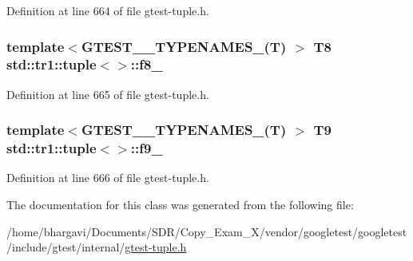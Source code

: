 Definition at line 664 of file gtest-\/tuple.\+h.

\subsubsection[{\texorpdfstring{f8\+\_\+}{f8_}}]{\setlength{\rightskip}{0pt plus 5cm}template$<$G\+T\+E\+S\+T\+\_\+\_\+\+T\+Y\+P\+E\+N\+A\+M\+E\+S\+\_\+(\+T) $>$ T8 {\bf std\+::tr1\+::tuple}$<$$>$\+::f8\+\_\+}\hypertarget{classstd_1_1tr1_1_1tuple_ae859012c83943e54e035a4a32089ccb6}{}\label{classstd_1_1tr1_1_1tuple_ae859012c83943e54e035a4a32089ccb6}


Definition at line 665 of file gtest-\/tuple.\+h.

\subsubsection[{\texorpdfstring{f9\+\_\+}{f9_}}]{\setlength{\rightskip}{0pt plus 5cm}template$<$G\+T\+E\+S\+T\+\_\+\_\+\+T\+Y\+P\+E\+N\+A\+M\+E\+S\+\_\+(\+T) $>$ T9 {\bf std\+::tr1\+::tuple}$<$$>$\+::f9\+\_\+}\hypertarget{classstd_1_1tr1_1_1tuple_a336d5e582fd34e45ec88c78d473671dd}{}\label{classstd_1_1tr1_1_1tuple_a336d5e582fd34e45ec88c78d473671dd}


Definition at line 666 of file gtest-\/tuple.\+h.



The documentation for this class was generated from the following file\+:\begin{DoxyCompactItemize}
\item 
/home/bhargavi/\+Documents/\+S\+D\+R/\+Copy\+\_\+\+Exam\+\_\+X/vendor/googletest/googletest/include/gtest/internal/\hyperlink{gtest-tuple_8h}{gtest-\/tuple.\+h}\end{DoxyCompactItemize}
